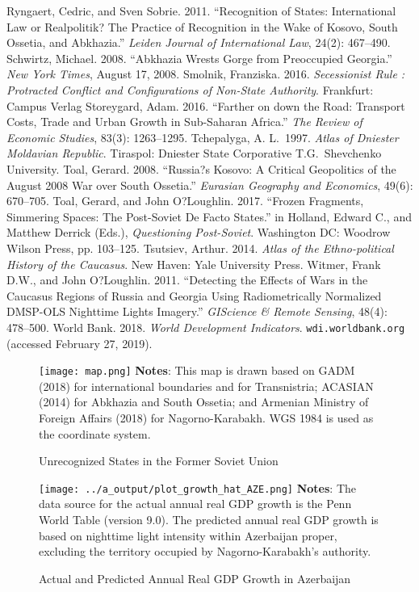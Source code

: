 \documentclass[12pt,a4paper]{article}%
\begin{document}
\begin{thebibliography}{99}
\bibitem{} Ryngaert, Cedric, and Sven Sobrie. 2011. ``Recognition of States: International Law or Realpolitik? The Practice of Recognition in the Wake of Kosovo, South Ossetia, and Abkhazia.'' \textit{Leiden Journal of International Law}, 24(2): 467--490.
\bibitem{} Schwirtz, Michael. 2008. ``Abkhazia Wrests Gorge from Preoccupied Georgia.'' \textit{New York Times}, August 17, 2008.
\bibitem{} Smolnik, Franziska. 2016. \textit{Secessionist Rule : Protracted Conflict and Configurations of Non-State Authority}. Frankfurt: Campus Verlag
\bibitem{} Storeygard, Adam. 2016. ``Farther on down the Road: Transport Costs, Trade and Urban Growth in Sub-Saharan Africa.'' \textit{The Review of Economic Studies}, 83(3): 1263--1295.
\bibitem{} Tchepalyga, A. L.\ 1997. \textit{Atlas of Dniester Moldavian Republic}. Tiraspol: Dniester State Corporative T.G.\ Shevchenko University.
\bibitem{} Toal, Gerard. 2008. ``Russia?s Kosovo: A Critical Geopolitics of the August 2008 War over South Ossetia.'' \textit{Eurasian Geography and Economics}, 49(6): 670--705.
\bibitem{} Toal, Gerard, and John O?Loughlin. 2017. ``Frozen Fragments, Simmering Spaces: The Post-Soviet De Facto States.'' in Holland, Edward C., and Matthew Derrick (Eds.), \textit{Questioning Post-Soviet}. Washington DC: Woodrow Wilson Press, pp. 103--125.
\bibitem{} Tsutsiev, Arthur. 2014. \textit{Atlas of the Ethno-political History of the Caucasus}. New Haven: Yale University Press.
\bibitem{} Witmer, Frank D.W., and John O?Loughlin. 2011. ``Detecting the Effects of Wars in the Caucasus Regions of Russia and Georgia Using Radiometrically Normalized DMSP-OLS Nighttime Lights Imagery.'' \textit{GIScience \& Remote Sensing}, 48(4): 478--500.
\bibitem{} World Bank. 2018. \textit{World Development Indicators}. \verb!wdi.worldbank.org! (accessed February 27, 2019).
\end{thebibliography}

\clearpage

\begin{figure}[ptb]
\caption{Unrecognized States in the Former Soviet Union}
\texttt{[image: map.png]}
\label{map}%
{\scriptsize \textbf{Notes}: 
	This map is drawn based on GADM (2018) for international boundaries and for Transnistria; ACASIAN (2014) for Abkhazia and South Ossetia; and Armenian Ministry of Foreign Affairs (2018) for Nagorno-Karabakh. WGS 1984 is used as the coordinate system.
}
\end{figure}

\begin{figure}[ptb]
\caption{Actual and Predicted Annual Real GDP Growth in Azerbaijan}
\texttt{[image: ../a\_output/plot\_growth\_hat\_AZE.png]}
\label{aze}%
{\scriptsize \textbf{Notes}: 
	The data source for the actual annual real GDP growth is the Penn World Table (version 9.0). 
	The predicted annual real GDP growth is based on nighttime light intensity within Azerbaijan proper, excluding the territory occupied by Nagorno-Karabakh's authority. 
}
\end{figure}
\end{document}
